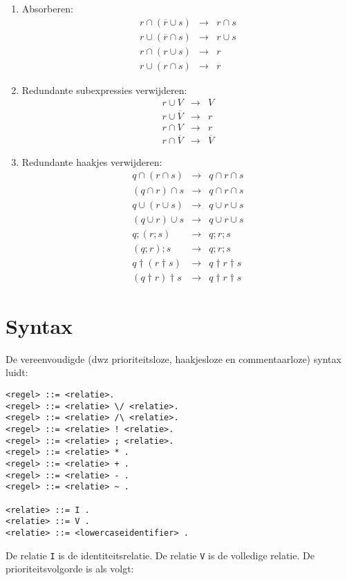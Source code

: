 \documentclass[11pt,a4paper,fleqn,oneside]{article}
\newcommand{\cmpl}[1]{\overline{#1}}
\newcommand{\compose}{;}
\begin{document}
\begin{enumerate}
\item	Absorberen:
  \[\begin{array}{rcl}
	r\cap(\cmpl{r}\cup s)&\rightarrow&r\cap s\\
	r\cup(\cmpl{r}\cap s)&\rightarrow&r\cup s\\
	r\cap(r\cup s)&\rightarrow&r\\
	r\cup(r\cap s)&\rightarrow&r
  \end{array}\]
\item	Redundante subexpressies verwijderen:
  \[\begin{array}{rcl}
	r\cup V&\rightarrow&V\\
	r\cup \cmpl{V}&\rightarrow&r\\
	r\cap V&\rightarrow&r\\
	r\cap \cmpl{V}&\rightarrow&\cmpl{V}
  \end{array}\]
\item	Redundante haakjes verwijderen:
  \[\begin{array}{rcl}
	q\cap(r\cap s)&\rightarrow&q\cap r\cap s\\
	(q\cap r)\cap s&\rightarrow&q\cap r\cap s\\
	q\cup(r\cup s)&\rightarrow&q\cup r\cup s\\
	(q\cup r)\cup s&\rightarrow&q\cup r\cup s\\
	q\compose(r\compose s)&\rightarrow&q\compose r\compose s\\
	(q\compose r)\compose s&\rightarrow&q\compose r\compose s\\
	q\dagger(r\dagger s)&\rightarrow&q\dagger r\dagger s\\
	(q\dagger r)\dagger s&\rightarrow&q\dagger r\dagger s
  \end{array}\]
\end{enumerate}

\section{Syntax}
	De vereenvoudigde (dwz prioriteitsloze, haakjesloze en commentaarloze) syntax luidt:
\begin{verbatim}
<regel> ::= <relatie>.
<regel> ::= <relatie> \/ <relatie>.
<regel> ::= <relatie> /\ <relatie>.
<regel> ::= <relatie> ! <relatie>.
<regel> ::= <relatie> ; <relatie>.
<regel> ::= <relatie> * .
<regel> ::= <relatie> + .
<regel> ::= <relatie> - .
<regel> ::= <relatie> ~ .

<relatie> ::= I .
<relatie> ::= V .
<relatie> ::= <lowercaseidentifier> .
\end{verbatim}
	De relatie \verb#I# is de identiteitsrelatie.
	De relatie \verb#V# is de volledige relatie.
	De prioriteitsvolgorde is als volgt:
	
\end{document}
